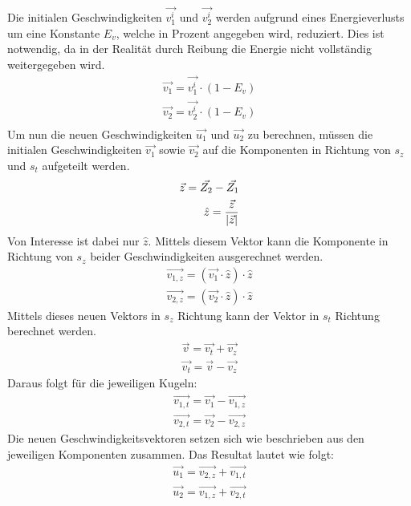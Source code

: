 Die initialen Geschwindigkeiten $\vec{v^i_1}$ und $\vec{v^i_2}$ werden aufgrund eines Energieverlusts um eine
Konstante $E_v$, welche in Prozent angegeben wird, reduziert. Dies ist notwendig, da in der Realität durch Reibung
die Energie nicht vollständig weitergegeben wird.
\begin{align}
    \vec{v_1} = \vec{v^i_1} \cdot (1 - E_v)\\
    \vec{v_2} = \vec{v^i_2} \cdot (1 - E_v)\\
\end{align}
Um nun die neuen Geschwindigkeiten $\vec{u_1}$ und $\vec{u_2}$ zu berechnen, müssen die initialen Geschwindigkeiten
$\vec{v_1}$ sowie $\vec{v_2}$ auf die Komponenten in Richtung von $s_z$ und $s_t$ aufgeteilt werden.
\begin{align}
    \vec{z} = \vec{Z_2} - \vec{Z_1}\\
    \hat{z} = \frac{\vec{z}}{\lvert \vec{z} \rvert}
\end{align}
Von Interesse ist dabei nur $\hat{z}$. Mittels diesem Vektor kann die Komponente in Richtung von $s_z$ beider Geschwindigkeiten
ausgerechnet werden.
\begin{align}
    \vec{v_{1,z}} = (\vec{v_1} \cdot \hat{z}) \cdot \hat{z}\\
    \vec{v_{2,z}} = (\vec{v_2} \cdot \hat{z}) \cdot \hat{z}
\end{align}
Mittels dieses neuen Vektors in $s_z$ Richtung kann der Vektor in $s_t$ Richtung berechnet werden.
\begin{align}
    \vec{v} = \vec{v_t} + \vec{v_z}\\
    \vec{v_t} = \vec{v} - \vec{v_z}
\end{align}
Daraus folgt für die jeweiligen Kugeln:
\begin{align}
    \vec{v_{1,t}} = \vec{v_1} - \vec{v_{1,z}}\\
    \vec{v_{2,t}} = \vec{v_2} - \vec{v_{2,z}}
\end{align}
Die neuen Geschwindigkeitsvektoren setzen sich wie beschrieben aus den jeweiligen Komponenten zusammen.
Das Resultat lautet wie folgt:
\begin{align}
    \vec{u_1} = \vec{v_{2,z}} + \vec{v_{1,t}}\\
    \vec{u_2} = \vec{v_{1,z}} + \vec{v_{2,t}}
\end{align}

